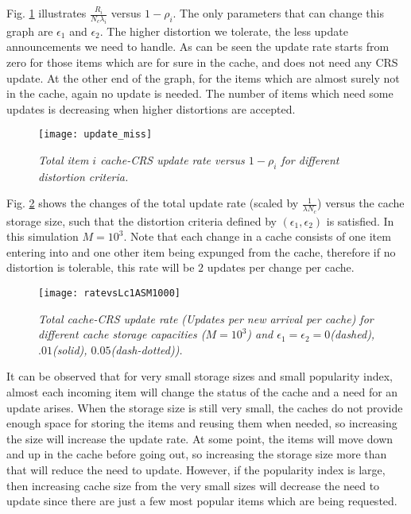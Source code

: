 \documentclass[conference]{IEEEtran}
\theoremstyle{plain}
\theoremstyle{remark}
\begin{document}
Fig. \ref{fig:updatemiss} illustrates $\frac{R_i}{N_c\lambda_i}$ versus $1-\rho_i$. The only parameters that can change this graph are $\epsilon_1$ and $\epsilon_2$. The higher distortion we tolerate, the less update announcements we need to handle. As can be seen the update rate starts from zero for those items which are for sure in the cache, and does not need any CRS update. At the other end of the graph, for the items which are almost surely not in the cache, again no update is needed. The number of items which need some updates is decreasing when higher distortions are accepted.

\begin{figure}[http]
    \center
      \texttt{[image: update\_miss]}\\
      \caption{\textit{Total item $i$ cache-CRS update rate versus $1-\rho_i$ for different distortion criteria.}}
    \label{fig:updatemiss}
\end{figure}

Fig. \ref{fig:lruLc} shows the changes of the total update rate (scaled by $\frac{1}{\lambda N_c}$) versus the cache storage size, such that the distortion criteria defined by $(\epsilon_1,\epsilon_2)$ is satisfied. In this simulation $M=10^3$. Note that each change in a cache consists of one item entering into and one other item being expunged from the cache, therefore if no distortion is tolerable, this rate will be $2$ updates per change per cache.

\begin{figure}[http]
    \center
      \texttt{[image: ratevsLc1ASM1000]}\\
      \caption{\textit{Total cache-CRS update rate (Updates per new arrival per cache) for different cache storage capacities ($M=10^3$) and $\epsilon_1=\epsilon_2=0$(dashed), $.01$(solid), $0.05$(dash-dotted)).}}
    \label{fig:lruLc}
\end{figure}

It can be observed that for very small storage sizes and small popularity index, almost each incoming item will change the status of the cache and a need for an update arises. When the storage size is still very small, the caches do not provide enough space for storing the items and reusing them when needed, so increasing the size will increase the update rate. At some point, the items will move down and up in the cache before going out, so increasing the storage size more than that will reduce the need to update. However, if the popularity index is large, then increasing cache size from the very small sizes will decrease the need to update since there are just a few most popular items which are being requested.
\end{document}
